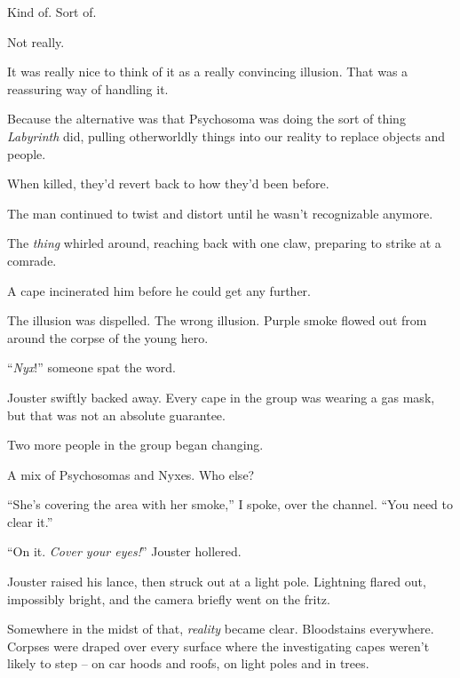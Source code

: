 Kind of.  Sort of.



Not really.



It was really nice to think of it as a really convincing illusion.  That was a reassuring way of handling it.



Because the alternative was that Psychosoma was doing the sort of thing \emph{Labyrinth }did, pulling otherworldly things into our reality to replace objects and people.



When killed, they'd revert back to how they'd been before.



The man continued to twist and distort until he wasn't recognizable anymore.



The \emph{thing} whirled around, reaching back with one claw, preparing to strike at a comrade.



A cape incinerated him before he could get any further.



The illusion was dispelled.  The wrong illusion.  Purple smoke flowed out from around the corpse of the young hero.



``\emph{Nyx}!'' someone spat the word.



Jouster swiftly backed away.  Every cape in the group was wearing a gas mask, but that was not an absolute guarantee.



Two more people in the group began changing.



A mix of Psychosomas and Nyxes.  Who else?



``She's covering the area with her smoke,'' I spoke, over the channel.  ``You need to clear it.''



``On it.  \emph{Cover your eyes!}''  Jouster hollered.



Jouster raised his lance, then struck out at a light pole.  Lightning flared out, impossibly bright, and the camera briefly went on the fritz.



Somewhere in the midst of that, \emph{reality} became clear.  Bloodstains everywhere.  Corpses were draped over every surface where the investigating capes weren't likely to step – on car hoods and roofs, on light poles and in trees.



